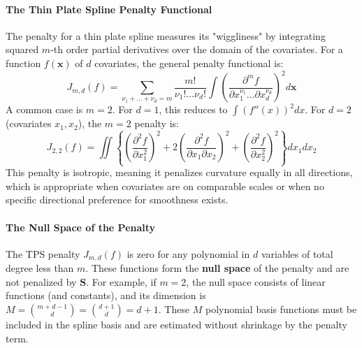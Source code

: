 \documentclass[11pt, a4paper]{article}
\begin{document}
\paragraph{The Thin Plate Spline Penalty Functional}
The penalty for a thin plate spline measures its "wiggliness" by integrating squared $m$-th order partial derivatives over the domain of the covariates. For a function $f(\mathbf{x})$ of $d$ covariates, the general penalty functional is:
\[ J_{m,d}(f) = \sum_{\nu_1+\dots+\nu_d = m} \frac{m!}{\nu_1! \dots \nu_d!} \int \left( \frac{\partial^m f}{\partial x_1^{\nu_1} \dots \partial x_d^{\nu_d}} \right)^2 d\mathbf{x} \]
A common case is $m=2$. For $d=1$, this reduces to $\int (f''(x))^2 dx$. For $d=2$ (covariates $x_1, x_2$), the $m=2$ penalty is:
\[ J_{2,2}(f) = \iint \left\{ \left(\frac{\partial^2 f}{\partial x_1^2}\right)^2 + 2\left(\frac{\partial^2 f}{\partial x_1 \partial x_2}\right)^2 + \left(\frac{\partial^2 f}{\partial x_2^2}\right)^2 \right\} dx_1 dx_2 \]
This penalty is isotropic, meaning it penalizes curvature equally in all directions, which is appropriate when covariates are on comparable scales or when no specific directional preference for smoothness exists.

\paragraph{The Null Space of the Penalty}
The TPS penalty $J_{m,d}(f)$ is zero for any polynomial in $d$ variables of total degree less than $m$. These functions form the \textbf{null space} of the penalty and are not penalized by $\mathbf{S}$. For example, if $m=2$, the null space consists of linear functions (and constants), and its dimension is $M = \binom{m+d-1}{d} = \binom{d+1}{d} = d+1$. These $M$ polynomial basis functions must be included in the spline basis and are estimated without shrinkage by the penalty term.
\end{document}
